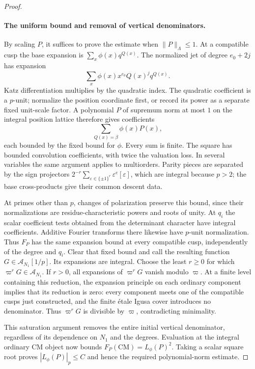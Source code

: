 \begin{proof}
 \paragraph{The uniform bound and removal of vertical denominators.}
 By scaling $P$, it suffices to prove the estimate when
 $\|P\|_\Lambda\leq1$.  At a compatible cusp the base expansion is
 $\sum_x\phi(x)q^{Q(x)}$.  The normalized jet of degree $e_0+2j$ has
 expansion
 \[
  \sum_x\phi(x)x^{e_0}Q(x)^j q^{Q(x)}.
 \]
 Katz differentiation multiplies by the quadratic index.  The
 quadratic coefficient is a $p$-unit; normalize the position coordinate
 first, or record its power as a separate fixed unit-scale factor.
 A polynomial $P$ of supremum norm at most $1$ on the integral position
 lattice therefore gives coefficients
 \begin{equation}\label{eq:moment-cusp-coefficient}
  \sum_{Q(x)=\beta}\phi(x)P(x),
 \end{equation}
 each bounded by the fixed bound for $\phi$.  Every sum is finite.
 The square has bounded convolution coefficients, with twice the
 valuation loss.  In several variables the same argument applies to
 multiorders.  Parity pieces are separated by the sign projectors
 $2^{-r}\sum_{\varepsilon\in\{\pm1\}^r}\varepsilon^e[\varepsilon]$,
 which are integral because $p>2$; the base cross-products give their
 common descent data.

 At primes other than $p$, changes of polarization preserve this
 bound, since their normalizations are residue-characteristic powers
 and roots of unity.  At $q_i$ the scalar coefficient tests obtained
 from the determinant character have integral coefficients.  Additive
 Fourier transforms there likewise have $p$-unit normalization.
 Thus $F_P$ has the same expansion bound at every compatible cusp,
 independently of the degree and $q_i$.  Clear that fixed bound and
 call the resulting function $G\in\mathcal A_{N_1}[1/p]$.
 Its expansions are integral.  Choose the least $r\geq0$ for which
 $\varpi^rG\in\mathcal A_{N_1}$.  If $r>0$, all expansions of
 $\varpi^rG$ vanish modulo $\varpi$.  At a finite level containing
 this reduction, the expansion principle on each ordinary component
 implies that its reduction is zero: every component meets one of
 the compatible cusps just constructed, and the finite \'etale
 Igusa cover introduces no denominator.  Thus $\varpi^rG$ is divisible
 by $\varpi$, contradicting minimality.

 This saturation argument removes the entire initial vertical
 denominator, regardless of its dependence on $N_1$ and the degrees.
 Evaluation at the integral ordinary CM object now bounds
 $F_P(\mathrm{CM})=L_\phi(P)^2$.  Taking a scalar square root proves
 $|L_\phi(P)|_p\leq C$ and hence the required polynomial-norm estimate.


\end{proof}
